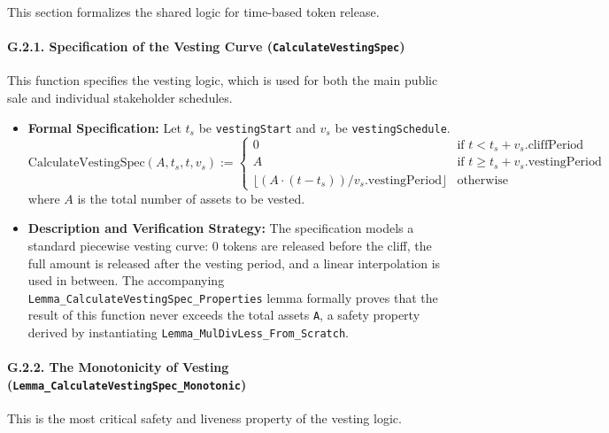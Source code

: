 \documentclass[
  english,
  onecolumn]{article}
\providecommand{\tightlist}{%
  \setlength{\itemsep}{0pt}\setlength{\parskip}{0pt}}
\begin{document}
This section formalizes the shared logic for time-based token release.

\paragraph{\texorpdfstring{G.2.1. Specification of the Vesting Curve
(\texttt{CalculateVestingSpec})}{G.2.1. Specification of the Vesting Curve (CalculateVestingSpec)}}\label{g.2.1.-specification-of-the-vesting-curve-calculatevestingspec}

This function specifies the vesting logic, which is used for both the
main public sale and individual stakeholder schedules.

\begin{itemize}
\tightlist
\item
  \textbf{Formal Specification:} Let \(t_s\) be \texttt{vestingStart}
  and \(v_s\) be \texttt{vestingSchedule}. \[
  \text{CalculateVestingSpec}(A, t_s, t, v_s) := \begin{cases}
  0 & \text{if } t < t_s + v_s.\text{cliffPeriod} \\
  A & \text{if } t \ge t_s + v_s.\text{vestingPeriod} \\
  \lfloor (A \cdot (t - t_s)) / v_s.\text{vestingPeriod} \rfloor & \text{otherwise}
  \end{cases}
  \] where \(A\) is the total number of assets to be vested.
\item
  \textbf{Description and Verification Strategy:} The specification
  models a standard piecewise vesting curve: 0 tokens are released
  before the cliff, the full amount is released after the vesting
  period, and a linear interpolation is used in between. The
  accompanying \texttt{Lemma\_CalculateVestingSpec\_Properties} lemma
  formally proves that the result of this function never exceeds the
  total assets \texttt{A}, a safety property derived by instantiating
  \texttt{Lemma\_MulDivLess\_From\_Scratch}.
\end{itemize}

\paragraph{\texorpdfstring{G.2.2. The Monotonicity of Vesting
(\texttt{Lemma\_CalculateVestingSpec\_Monotonic})}{G.2.2. The Monotonicity of Vesting (Lemma\_CalculateVestingSpec\_Monotonic)}}\label{g.2.2.-the-monotonicity-of-vesting-lemma_calculatevestingspec_monotonic}

This is the most critical safety and liveness property of the vesting
logic.
\end{document}
